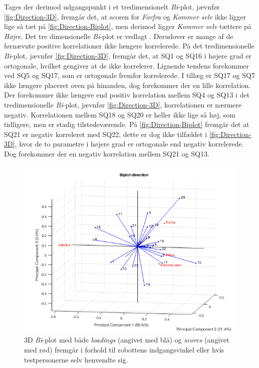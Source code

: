 \noindent
%
Tages der derimod udgangspunkt i et tredimensionelt \textit{Bi}-plot, jævnfør \autoref{fig:Direction-3D}, fremgår det, at scoren for \textit{Forfra} og \textit{Kommer selv} ikke ligger lige så tæt på \autoref{fig:Direction-Biplot}, men derimod ligger \textit{Kommer selv} tættere på \textit{Højre}. Det tre dimensionelle \textit{Bi}-plot er vedlagt . Derudover er mange af de førnævnte positive korrelationer ikke længere korrelerede. På det tredimensionelle \textit{Bi}-plot, jævnfør \autoref{fig:Direction-3D}, fremgår det, at SQ1 og SQ16 i højere grad er ortogonale, hvilket gengiver at de ikke korrelerer. Lignende tendens forekommer ved SQ5 og SQ17, som er ortogonale fremfor korrelerede. I tillæg er SQ17 og SQ7 ikke længere placeret oven på hinanden, dog forekommer der en lille korrelation. Der forekommer ikke længere end positiv korrelation mellem SQ4 og SQ13 i det tredimensionelle \textit{Bi}-plot, jævnfør \autoref{fig:Direction-3D}, korrelationen er nærmere negativ. Korrelationen mellem SQ18 og SQ20 er heller ikke lige så høj, som tidligere, men er stadig tilstedeværende. På \autoref{fig:Direction-Biplot} fremgår det at SQ21 er negativ korreleret med SQ22, dette er dog ikke tilfældet i \autoref{fig:Direction-3D}, hvor de to parametre i højere grad er ortogonale end negativ korrelerede. Dog forekommer der en negativ korrelation mellem SQ21 og SQ13.
%
\begin{figure}[H]
\centering
\includegraphics[width=\textwidth]{Figure/DatabehandlingSkalaer/PCAfigures/Direction-3D.png}
\caption{3D \textit{Bi}-plot med både \textit{loadings} (angivet med blå) og \textit{scores} (angivet med rød) fremgår i forhold til robottens indgangsvinkel eller hvis testpersonerne selv henvendte sig.}
\label{fig:Direction-3D}
\end{figure}
%

